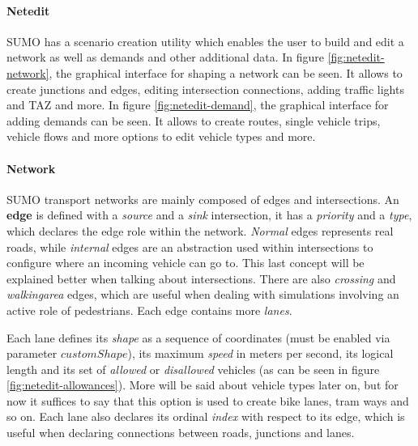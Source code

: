 \paragraph{Netedit}

SUMO has a scenario creation utility which enables the user to build and edit a network as well as demands and other additional data.
In figure \ref{fig:netedit-network}, the graphical interface for shaping a network can be seen. It allows to create junctions and edges, editing intersection connections, adding traffic lights and TAZ and more.
In figure \ref{fig:netedit-demand}, the graphical interface for adding demands can be seen. It allows to create routes, single vehicle trips, vehicle flows and more options to edit vehicle types and more.


\paragraph{Network}

SUMO transport networks are mainly composed of edges and intersections. An \textbf{edge} is defined with a \textit{source} and a \textit{sink} intersection, it has a \textit{priority} and a \textit{type}, which declares the edge role within the network. \textit{Normal} edges represents real roads, while \textit{internal} edges are an abstraction used within intersections to configure where an incoming vehicle can go to. This last concept will be explained better when talking about intersections. There are also \textit{crossing} and \textit{walkingarea} edges, which are useful when dealing with simulations involving an active role of pedestrians. Each edge contains more \textit{lanes}.

Each lane defines its \textit{shape} as a sequence of coordinates (must be enabled via parameter $customShape$), its maximum \textit{speed} in meters per second, its logical length and its set of \textit{allowed} or \textit{disallowed} vehicles (as can be seen in figure \ref{fig:netedit-allowances}). More will be said about vehicle types later on, but for now it suffices to say that this option is used to create bike lanes, tram ways and so on. Each lane also declares its ordinal \textit{index} with respect to its edge, which is useful when declaring connections between roads, junctions and lanes.

